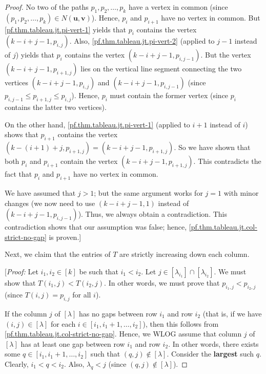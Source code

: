 \documentclass[reqno]{amsart}%
\newcommand{\0}{\phantom{c}}
\theoremstyle{plain}
\theoremstyle{definition}
\numberwithin{equation}{section}
\begin{document}
\begin{proof}
No two of the paths $p_{1},p_{2},\ldots,p_{k}$ have a vertex in common (since
$\left(  p_{1},p_{2},\ldots,p_{k}\right)  \in N\left(  \mathbf{u}%
,\mathbf{v}\right)  $). Hence, $p_{i}$ and $p_{i+1}$ have no vertex in common.
But \eqref{pf.thm.tableau.jt.pi-vert-1} yields that $p_{i}$ contains the
vertex $\left(  k-i+j-1,p_{i,j}\right)  $. Also,
\eqref{pf.thm.tableau.jt.pi-vert-2} (applied to $j-1$ instead of $j$) yields
that $p_{i}$ contains the vertex $\left(  k-i+j-1,p_{i,j-1}\right)  $. But the
vertex $\left(  k-i+j-1,p_{i+1,j}\right)  $ lies on the vertical line segment
connecting the two vertices $\left(  k-i+j-1,p_{i,j}\right)  $ and $\left(
k-i+j-1,p_{i,j-1}\right)  $ (since $p_{i,j-1}\leq p_{i+1,j}\leq p_{i,j}$).
Hence, $p_{i}$ must contain the former vertex (since $p_{i}$ contains the
latter two vertices).

On the other hand, \eqref{pf.thm.tableau.jt.pi-vert-1} (applied to $i+1$
instead of $i$) shows that $p_{i+1}$ contains the vertex $\left(  k-\left(
i+1\right)  +j,p_{i+1,j}\right)  =\left(  k-i+j-1,p_{i+1,j}\right)  $. So we
have shown that both $p_{i}$ and $p_{i+1}$ contain the vertex $\left(
k-i+j-1,p_{i+1,j}\right)  $. This contradicts the fact that $p_{i}$ and
$p_{i+1}$ have no vertex in common.

We have assumed that $j>1$; but the same argument works for $j=1$ with minor
changes (we now need to use $\left(  k-i+j-1,1\right)  $ instead of $\left(
k-i+j-1,p_{i,j-1}\right)  $). Thus, we always obtain a contradiction. This
contradiction shows that our assumption was false; hence,
\eqref{pf.thm.tableau.jt.col-strict-no-gap} is proven.]

Next, we claim that the entries of $T$ are strictly increasing down each column.

[\textit{Proof:} Let $i_{1},i_{2}\in\left[  k\right]  $ be such that
$i_{1}<i_{2}$. Let $j\in\left[  \lambda_{i_{1}}\right]  \cap\left[
\lambda_{i_{2}}\right]  $. We must show that $T\left(  i_{1},j\right)
<T\left(  i_{2},j\right)  $. In other words, we must prove that $p_{i_{1}%
,j}<p_{i_{2},j}$ (since $T\left(  i,j\right)  =p_{i,j}$ for all $i$).

If the column $j$ of $\left[  \lambda\right]  $ has no gaps between row
$i_{1}$ and row $i_{2}$ (that is, if we have $\left(  i,j\right)  \in\left[
\lambda\right]  $ for each $i\in\left[  i_{1},i_{1}+1,\ldots,i_{2}\right]  $),
then this follows from \eqref{pf.thm.tableau.jt.col-strict-no-gap}. Hence, we
WLOG assume that column $j$ of $\left[  \lambda\right]  $ has at least one gap
between row $i_{1}$ and row $i_{2}$. In other words, there exists some
$q\in\left[  i_{1},i_{1}+1,\ldots,i_{2}\right]  $ such that $\left(
q,j\right)  \notin\left[  \lambda\right]  $. Consider the \textbf{largest}
such $q$. Clearly, $i_{1}<q<i_{2}$. Also, $\lambda_{q}<j$ (since $\left(
q,j\right)  \notin\left[  \lambda\right]  $).


\end{proof}
\end{document}
